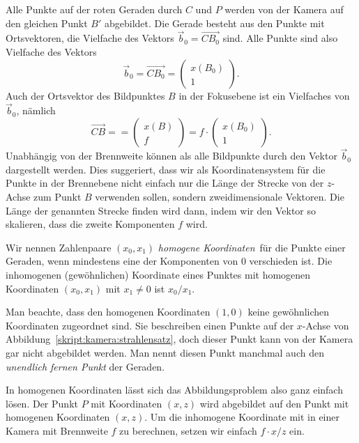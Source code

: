 Alle Punkte auf der roten Geraden durch $C$ und $P$ werden von der Kamera
auf den gleichen Punkt $B'$ abgebildet.
Die Gerade besteht aus den Punkte mit Ortsvektoren, die Vielfache des
Vektors $\vec{b}_0=\overrightarrow{CB_0}$ sind.
Alle Punkte sind also Vielfache des Vektors 
\[
\vec{b}_0
=
\overrightarrow{CB_0}
=
\begin{pmatrix}x(B_0)\\1\end{pmatrix}.
\]
Auch der Ortsvektor des Bildpunktes $B$ in der Fokusebene ist ein Vielfaches 
von $\vec{b}_0$, nämlich
\[
\overrightarrow{CB} =
=
\begin{pmatrix}x(B)\\f\end{pmatrix}
=
f \cdot
\begin{pmatrix}x(B_0)\\1\end{pmatrix}.
\]
Unabhängig von der Brennweite können als alle Bildpunkte durch 
den Vektor $\vec{b}_0$ dargestellt werden.
Dies suggeriert, dass wir als Koordinatensystem für die Punkte in der
Brennebene nicht einfach nur die Länge der Strecke von der $z$-Achse 
zum Punkt $B$ verwenden sollen, sondern zweidimensionale Vektoren.
Die Länge der genannten Strecke finden wird dann, indem wir den Vektor
so skalieren, dass die zweite Komponenten $f$ wird.

\begin{definition}
Wir nennen Zahlenpaare $(x_0,x_1)$ {\em homogene Koordinaten} für die
Punkte einer Geraden, wenn mindestens eine der Komponenten von $0$
verschieden ist.
Die inhomogenen (gewöhnlichen) Koordinate eines Punktes mit
homogenen Koordinaten $(x_0,x_1)$ mit $x_1\ne 0$ ist $x_0/x_1$.
\end{definition}
%
Man beachte, dass den homogenen Koordinaten $(1,0)$ keine gewöhnlichen
Koordinaten zugeordnet sind.
Sie beschreiben einen Punkte auf der $x$-Achse von
Abbildung~\ref{skript:kamera:strahlensatz}, doch dieser Punkt kann
von der Kamera gar nicht abgebildet werden.
Man nennt diesen Punkt manchmal auch den {\em unendlich fernen Punkt} der
Geraden.
%

In homogenen Koordinaten lässt sich das Abbildungsproblem also ganz
einfach lösen. 
Der Punkt $P$ mit Koordinaten $(x,z)$ wird abgebildet auf den Punkt
mit homogenen Koordinaten $(x,z)$.
Um die inhomogene Koordinate mit in einer Kamera mit Brennweite $f$ zu
berechnen, setzen wir einfach $f\cdot x/z$ ein.

